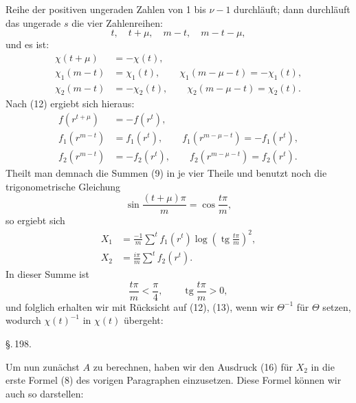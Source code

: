 
Reihe der positiven ungeraden Zahlen von 1 bis $\nu - 1$ durchl\"auft;
dann durchl\"auft das ungerade $s$ die vier Zahlenreihen:
\[
t, \quad t+\mu, \quad m-t, \quad m-t-\mu,
\]
und es ist:
\[
\begin{aligned}
\chi(t+\mu) &= -\chi(t), \\
\chi_1(m-t) &= \chi_1(t), \qquad \chi_1(m-\mu-t) = -\chi_1(t), \\
\chi_2(m-t) &= -\chi_2(t), \qquad \chi_2(m-\mu-t) = \chi_2(t).
\end{aligned}
\]
Nach (12) ergiebt sich hieraus:
\[
\begin{aligned}
f(r^{t+\mu}) &= -f(r^t), \\
f_1(r^{m-t}) &= f_1(r^t), \qquad f_1(r^{m-\mu-t}) = -f_1(r^t), \\
f_2(r^{m-t}) &= -f_2(r^t), \qquad f_2(r^{m-\mu-t}) = f_2(r^t).
\end{aligned}
\]
Theilt man demnach die Summen (9) in je vier Theile und benutzt noch
die trigonometrische Gleichung
\[
\sin \frac{(t+\mu)\pi}{m} = \cos \frac{t\pi}{m},
\]
so ergiebt sich
\[
\begin{aligned}
X_1 &= \frac{-1}{m} \sum^{t} f_1(r^t)
\log\left(\operatorname{tg} \frac{t\pi}{m}\right)^2, \\
X_2 &= \frac{i\pi}{m} \sum^{t} f_2(r^t).
\end{aligned}
\]
In dieser Summe ist
\[
\frac{t\pi}{m} < \frac{\pi}{4}, \qquad
\operatorname{tg} \frac{t\pi}{m} > 0,
\]
und folglich erhalten wir mit R\"ucksicht auf (12), (13), wenn wir
$\Theta^{-1}$ f\"ur $\Theta$ setzen, wodurch $\chi(t)^{-1}$ in $\chi(t)$
\"ubergeht:

\begin{center}
\S.\,198.

\end{center}

Um nun zun\"achst $A$ zu berechnen, haben wir den Ausdruck (16) f\"ur
$X_2$ in die erste Formel (8) des vorigen Paragraphen einzusetzen.
Diese Formel k\"onnen wir auch so darstellen:
